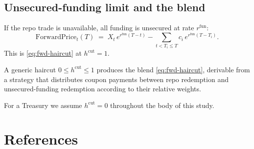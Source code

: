 \documentclass[11pt]{article}
\theoremstyle{definition}
\newcommand{\FwdP}{\ensuremath{\mathrm{ForwardPrice}}}
\newcommand{\rfun}{r^{\mathrm{fun}}}
\begin{document}
\subsection{Unsecured-funding limit and the blend}

If the repo trade is unavailable, all funding is unsecured at rate
$\rfun$:
\begin{equation}
\FwdP_t(T) \;=\; X_t\,e^{\rfun(T-t)}
                  - \sum_{t<T_i\le T} c_i\,e^{\rfun(T - T_i)}.
\label{eq:fwd-full-funding}
\end{equation}
This is \cref{eq:fwd-haircut} at $h^{\mathrm{cut}} = 1$.

A generic haircut $0 \le h^{\mathrm{cut}} \le 1$ produces the blend
\cref{eq:fwd-haircut}, derivable from a strategy that distributes
coupon payments between repo redemption and unsecured-funding redemption
according to their relative weights.

For a Treasury we assume $h^{\mathrm{cut}} = 0$ throughout
the body of this study.


\section{References}\label{sec:bib}
\end{document}
